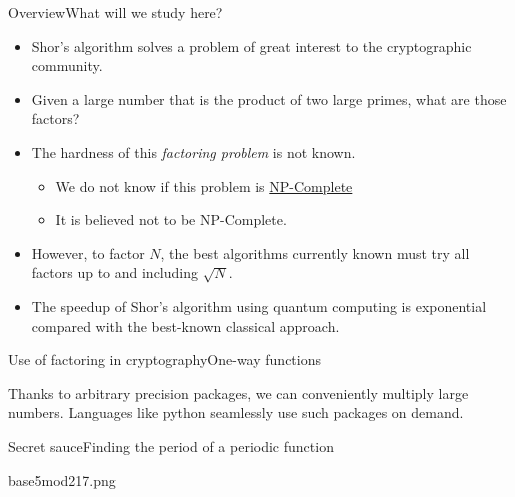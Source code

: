 
\begin{frame}{Overview}{What will we study here?}

\begin{itemize}
    \item Shor's algorithm solves a problem of great interest to the cryptographic community.
    \item Given a large number that is the product of two large primes, what are those factors?
    \item The hardness of this \emph{factoring problem} is not known.
    \begin{itemize}
        \item We do not know if this problem is \href{https://en.wikipedia.org/wiki/NP-completeness}{NP-Complete}
        \item It is believed not to be NP-Complete.
    \end{itemize}
    \item However, to factor $N$, the best algorithms currently known must try all factors up to and including $\sqrt{N}$.
    \item The speedup of Shor's algorithm using quantum computing is exponential compared with the best-known classical approach.
\end{itemize}
    
\end{frame}

\begin{frame}{Use of factoring in cryptography}{One-way functions}

\BigSkip{}%
Thanks to arbitrary precision packages, we can conveniently multiply large numbers.  Languages like python seamlessly use such packages on demand.
\end{frame}

\begin{frame}{Secret sauce}{Finding the period of a periodic function}
\Vskip{-4em}\begin{center}
\begin{Pixture}[width=0.65\textwidth]{27}{base5mod217.png}
\end{Pixture}\end{center}
\TwoColumns{%
}{%

}
    
\end{frame}